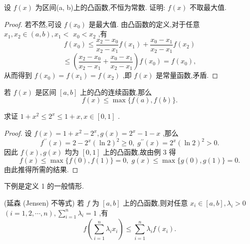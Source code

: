 \begin{example}
设 \(f\left( x\right)\) 为区间(a, b)上的凸函数,不恒为常数. 证明: \(f\left( x\right)\) 不取最大值.
\end{example}


\begin{proof}
若不然,可设 \(f\left( {x}_{0}\right)\) 是最大值. 由凸函数的定义,对于任意 \({x}_{1},{x}_{2} \in  \left( {a,b}\right) ,{x}_{1} <\)  \({x}_{0} < {x}_{2}\) ,有
\[
f\left( {x}_{0}\right)  \leq  \frac{{x}_{2} - {x}_{0}}{{x}_{2} - {x}_{1}}f\left( {x}_{1}\right)  + \frac{{x}_{0} - {x}_{1}}{{x}_{2} - {x}_{1}}f\left( {x}_{2}\right)
\]
\[
\leq  \left( {\frac{{x}_{2} - {x}_{0}}{{x}_{2} - {x}_{1}} + \frac{{x}_{0} - {x}_{1}}{{x}_{2} - {x}_{1}}}\right) f\left( {x}_{0}\right)  = f\left( {x}_{0}\right) ,
\]
从而得到 \(f\left( {x}_{0}\right)  = f\left( {x}_{1}\right)  = f\left( {x}_{2}\right)\) ,即 \(f\left( x\right)\) 是常量函数,矛盾.
\end{proof}


\begin{remark}
若 \(f\left( x\right)\) 是区间 \(\left\lbrack  {a,b}\right\rbrack\) 上的凸的连续函数,那么
\[
f\left( x\right)  \leq  \max \{ f\left( a\right) ,f\left( b\right) \} .
\]
\end{remark}

\begin{example}
求证 \(1 + {x}^{2} \leq  {2}^{x} \leq  1 + x,x \in  \left\lbrack  {0,1}\right\rbrack\) .
\end{example}


\begin{proof}
设 \(f\left( x\right)  = 1 + {x}^{2} - {2}^{x},g\left( x\right)  = {2}^{x} - 1 - x\) ,那么
\[
{f}^{\prime \prime }\left( x\right)  = 2 - {2}^{x}{\left( \ln 2\right) }^{2} \geq  0,\;{g}^{\prime \prime }\left( x\right)  = {2}^{x}{\left( \ln 2\right) }^{2} > 0.
\]
因此 \(f\left( x\right) ,g\left( x\right)\) 均为 \(\left\lbrack  {0,1}\right\rbrack\) 上的凸函数,故由例 3 得
\[
f\left( x\right)  \leq  \max \{ f\left( 0\right) ,f\left( 1\right) \}  = 0,\;g\left( x\right)  \leq  \max \{ g\left( 0\right) ,g\left( 1\right) \}  = 0.
\]
由此推得所需的结果.
\end{proof}


下例是定义 1 的一般情形.

\begin{example}
(延森 (Jensen) 不等式) 若 \(f\) 为 \(\left\lbrack  {a,b}\right\rbrack\) 上的凸函数,则对任意 \({x}_{i} \in  \left\lbrack  {a,b}\right\rbrack  ,{\lambda }_{i} > 0\)  \(\left( {i = 1,2,\cdots ,n}\right) ,\mathop{\sum }\limits_{{i = 1}}^{n}{\lambda }_{i} = 1\) ,有
\[
f\left( {\mathop{\sum }\limits_{{i = 1}}^{n}{\lambda }_{i}{x}_{i}}\right)  \leq  \mathop{\sum }\limits_{{i = 1}}^{n}{\lambda }_{i}f\left( {x}_{i}\right) . \tag{6}
\]
\end{example}

